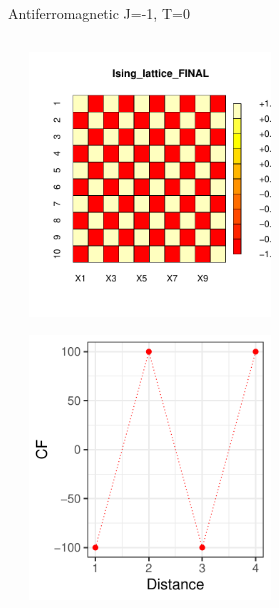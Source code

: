 \documentclass{beamer}
\begin{document}
\begin{frame}{Antiferromagnetic J=-1, T=0}
\begin{columns}
\begin{column}{0.5\textwidth}
\begin{center}
     \end{center}
\end{column}
\begin{column}{0.5\textwidth}
    \begin{center}
     \includegraphics[width=0.5\textwidth]{Pic/J-1_10_6000_T=0_FINAL.pdf}
     \end{center}
         \begin{center}
     \includegraphics[width=0.5\textwidth]{Pic/J-1_10_6000_T=0_CORRELATION.pdf}
     \end{center}
\end{column}
\end{columns}
\end{frame}
\end{document}
